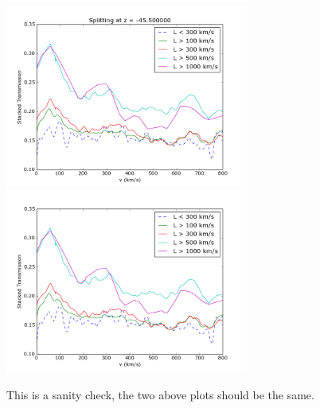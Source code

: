 \documentclass[11pt]{article}
\begin{document}
\begin{figure}[h]
  \centering
  \includegraphics[width=8cm]{Stack_SanityCut.png}
  \includegraphics[width=8cm]{Stack_SanityCutCorrect.png}
  \caption{This is a sanity check, the two above plots should be the same.}
  \label{fig:todo}
\end{figure}
\end{document}
